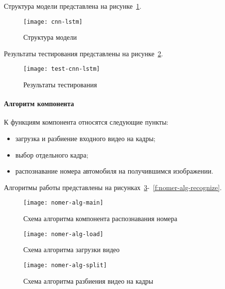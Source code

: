 Структура модели представлена на рисунке~\ref{f:cnn-lstm}.

\begin{figure}[h!]
	\centering
	\vspace{\toppaddingoffigure}
	\texttt{[image: cnn-lstm]}
	\caption{Структура модели}
	\label{f:cnn-lstm}
\end{figure}

Результаты тестирования представлены на рисунке~\ref{f:test-cnn-lstm}.

\begin{figure}[h!]
	\centering
	\texttt{[image: test-cnn-lstm]}
	\caption{Результаты тестирования}
	\label{f:test-cnn-lstm}
\end{figure}

\newpage

\paragraph{Алгоритм компонента}

К функциям компонента относятся следующие пункты:
\begin{itemize}
    \item загрузка и разбиение входного видео на кадры;
    \item выбор отдельного кадра;
    \item распознавание номера автомобиля на получившимся изображении.
\end{itemize}

Алгоритмы работы представлены на рисунках~\ref{f:nomer-alg-main}-~\ref{f:nomer-alg-recognize}.

\begin{figure}[h!]
	\centering
	\texttt{[image: nomer-alg-main]}
	\caption{Схема алгоритма компонента распознавания номера}
	\label{f:nomer-alg-main}
\end{figure}

\newpage
\begin{figure}[h!]
	\centering
	\texttt{[image: nomer-alg-load]}
	\caption{Схема алгоритма загрузки видео}
	\label{f:nomer-alg-load}
\end{figure}

\begin{figure}[h!]
	\centering
	\texttt{[image: nomer-alg-split]}
	\caption{Схема алгоритма разбиения видео на кадры}
	\label{f:nomer-alg-split}
\end{figure}

